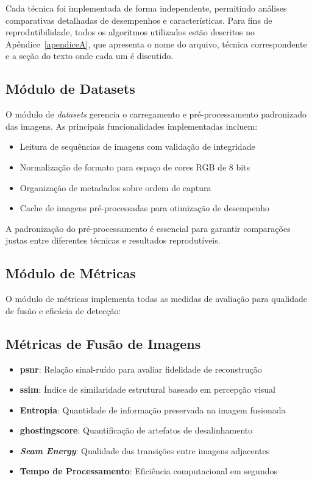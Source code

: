 Cada técnica foi implementada de forma independente, permitindo análises comparativas detalhadas de desempenhos e características. Para fins de reprodutibilidade, todos os algoritmos utilizados estão descritos no Apêndice~\ref{apendiceA}, que apresenta o nome do arquivo, técnica correspondente e a seção do texto onde cada um é discutido.


\subsection*{Módulo de Datasets}

O módulo de \textit{datasets} gerencia o carregamento e pré-processamento padronizado das imagens. As principais funcionalidades implementadas incluem:

\begin{itemize}
    \item Leitura de sequências de imagens com validação de integridade
    \item Normalização de formato para espaço de cores RGB de 8 bits
    \item Organização de metadados sobre ordem de captura
    \item Cache de imagens pré-processadas para otimização de desempenho
\end{itemize}

A padronização do pré-processamento é essencial para garantir comparações justas entre diferentes técnicas e resultados reprodutíveis.

\subsection*{Módulo de Métricas}

O módulo de métricas implementa todas as medidas de avaliação para qualidade de fusão e eficácia de detecção:

\subsection*{Métricas de Fusão de Imagens}

\begin{itemize}
    \item \textbf{\gls{psnr}}: Relação sinal-ruído para avaliar fidelidade de reconstrução
    \item \textbf{\gls{ssim}}: Índice de similaridade estrutural baseado em percepção visual
    \item \textbf{Entropia}: Quantidade de informação preservada na imagem fusionada
    \item \textbf{\gls{ghostingscore}}: Quantificação de artefatos de desalinhamento
    \item \textbf{\textit{Seam Energy}}: Qualidade das transições entre imagens adjacentes
    \item \textbf{Tempo de Processamento}: Eficiência computacional em segundos
\end{itemize}

